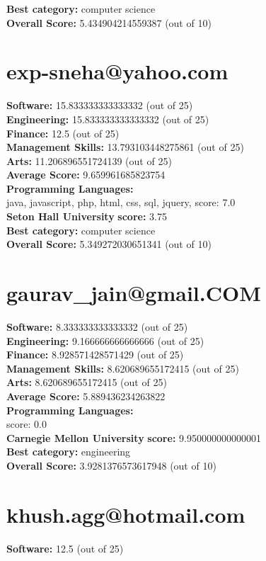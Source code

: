 \documentclass{article}
\begin{document}
\textbf{Best category: } computer science\\
\textbf{Overall Score: }5.434904214559387 (out of 10)\section{exp-sneha@yahoo.com}
\textbf{Software:} 15.833333333333332 (out of 25)\\
\textbf{Engineering: } 15.833333333333332 (out of 25)\\
\textbf{Finance:} 12.5 (out of 25)\\
\textbf{Management Skills:} 13.793103448275861 (out of 25)\\
\textbf{Arts:} 11.206896551724139 (out of 25)\\
\textbf{Average Score: } 9.659961685823754\\
\textbf{Programming Languages:} \\
java, javascript, php, html, css, sql, jquery, score: 7.0\\
\textbf{Seton Hall University} \textbf{score:} 3.75\\
\textbf{Best category: } computer science\\
\textbf{Overall Score: }5.349272030651341 (out of 10)\section{gaurav_jain@gmail.COM}
\textbf{Software:} 8.333333333333332 (out of 25)\\
\textbf{Engineering: } 9.166666666666666 (out of 25)\\
\textbf{Finance:} 8.928571428571429 (out of 25)\\
\textbf{Management Skills:} 8.620689655172415 (out of 25)\\
\textbf{Arts:} 8.620689655172415 (out of 25)\\
\textbf{Average Score: } 5.889436234263822\\
\textbf{Programming Languages:} \\
score: 0.0\\
\textbf{Carnegie Mellon University} \textbf{score:} 9.950000000000001\\
\textbf{Best category: } engineering\\
\textbf{Overall Score: }3.9281376573617948 (out of 10)\section{khush.agg@hotmail.com}
\textbf{Software:} 12.5 (out of 25)\\
\end{document}
